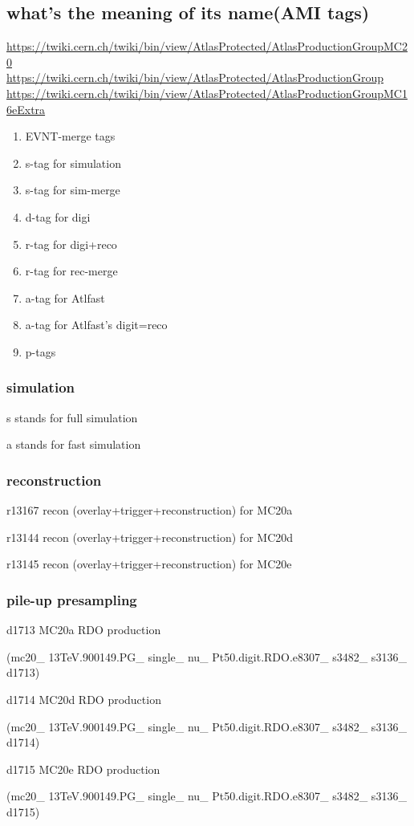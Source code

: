 \documentclass{ctexart}
\begin{document}
\subsection{what's the meaning of its name(AMI tags)}
\url{https://twiki.cern.ch/twiki/bin/view/AtlasProtected/AtlasProductionGroupMC20}\\
\url{https://twiki.cern.ch/twiki/bin/view/AtlasProtected/AtlasProductionGroup}\\
\url{https://twiki.cern.ch/twiki/bin/view/AtlasProtected/AtlasProductionGroupMC16eExtra}
\begin{enumerate}[1)]
\item EVNT-merge tags
\item s-tag for simulation
\item s-tag for sim-merge
\item d-tag for digi
\item r-tag for digi+reco
\item r-tag for rec-merge
\item a-tag for Atlfast
\item a-tag for Atlfast's digit=reco
\item p-tags
\end{enumerate}
\subsubsection{simulation}
s stands for full simulation\par
a stands for fast simulation
\subsubsection{reconstruction}
r13167 recon (overlay+trigger+reconstruction) for MC20a\par
r13144 recon (overlay+trigger+reconstruction) for MC20d\par
r13145 recon (overlay+trigger+reconstruction) for MC20e
\subsubsection{pile-up presampling}
d1713 MC20a RDO production \par
(mc20\_ 13TeV.900149.PG\_ single\_ nu\_ Pt50.digit.RDO.e8307\_ s3482\_ s3136\_ d1713)\par
d1714 MC20d RDO production \par
(mc20\_ 13TeV.900149.PG\_ single\_ nu\_ Pt50.digit.RDO.e8307\_ s3482\_ s3136\_ d1714)\par
d1715 MC20e RDO production \par
(mc20\_ 13TeV.900149.PG\_ single\_ nu\_ Pt50.digit.RDO.e8307\_ s3482\_ s3136\_ d1715)
\end{document}

